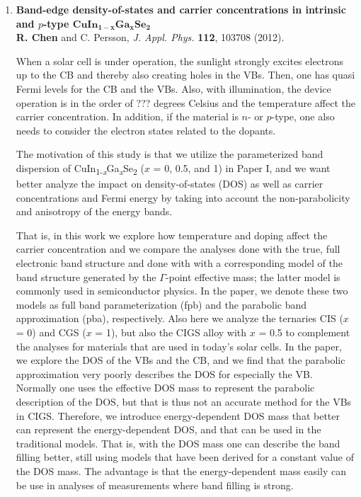 \documentclass[a4paper, 12pt, titlepage,oneside,drop]{kthesis}
\begin{document}
\begin{enumerate}
\item{}\textbf{Band-edge density-of-states and carrier concentrations in intrinsic and $p$-type $\mathbf {CuIn_{1-x}Ga_{x}Se_2}$}
\\\textbf{R. Chen} and C. Persson, \textit{J. Appl. Phys.} {\textbf {112}}, 103708 (2012).

\noindent 
When a solar cell is under operation, the sunlight  strongly excites electrons up to the CB and
thereby also creating holes in the VBs. Then, one has quasi Fermi levels for the CB and the VBs.  
Also, with illumination, the device operation is in the order of ??? degrees Celsius and the temperature 
affect the carrier concentration. 
In addition, if the material is $n$- or $p$-type, one also needs to consider the electron states related 
to the dopants.    

The motivation of this study is that we utilize the parameterized band dispersion of 
CuIn\textsubscript{1-\textit{x}}Ga\textsubscript{\textit{x}}Se\textsubscript{2} ($x$ = 0, 0.5, and 1) 
in Paper I, and we want 
better analyze the impact on density-of-states (DOS) as well as carrier concentrations and Fermi energy
by taking into account the non-parabolicity and anisotropy of the energy bands. 

 
That is, in this work we explore how temperature and doping affect the carrier concentration and we compare the 
analyses done with  the true, full electronic band structure and done with with a corresponding model 
of the band structure generated 
by the $\Gamma$-point effective mass; the latter model is commonly used in semiconductor physics. 
In the paper, we denote these two models as full band parameterization (fpb) and the parabolic band approximation (pba), respectively.  
Also here we analyze the ternaries CIS ($x$ = 0) and CGS ($x$ = 1), but also the CIGS alloy with $x$ = 0.5 to complement the analyses for materials that are used in today's solar cells. 
In the paper, we explore the DOS of the VBs and the CB, and we find that the parabolic approximation very poorly describes the DOS for especially the VB. Normally one uses the effective DOS mass to represent 
the parabolic description of the DOS, but that is thus not an accurate method for the VBs in CIGS. Therefore, we introduce energy-dependent DOS mass that better can represent the energy-dependent DOS, and that can 
be used in the traditional models. That is, with the DOS mass one can describe the band filling better, still using models that have been derived for a constant value of the DOS mass. The advantage is that the energy-dependent 
mass easily can be use in analyses of measurements where band filling is strong.


\end{enumerate}
\end{document}
